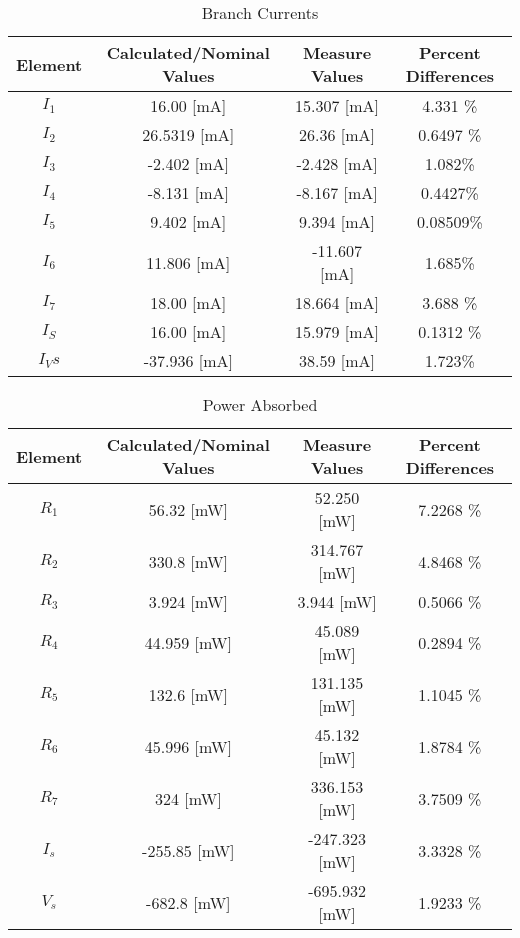 \documentclass{article}
\begin{document}
\begin{table}[h]
\begin{center}
\label{code:resis}
\caption{Branch Currents}
\begin{tabular}{c|c|c|c}
Element & Calculated/Nominal Values & Measure Values & Percent Differences 
\\\hline
$I_1$ & 16.00 [mA] & 15.307 [mA] & 4.331 \% \\
$I_2$ & 26.5319 [mA] & 26.36 [mA] & 0.6497 \% \\
$I_3$ & -2.402 [mA] & -2.428 [mA] & 1.082\% \\
$I_4$ & -8.131 [mA] & -8.167 [mA] & 0.4427\% \\
$I_5$ & 9.402 [mA] & 9.394 [mA] & 0.08509\% \\
$I_6$ & 11.806 [mA] & -11.607 [mA] & 1.685\% \\
$I_7$ & 18.00 [mA] & 18.664 [mA] & 3.688 \% \\
$I_S$ & 16.00 [mA] & 15.979 [mA] & 0.1312 \% \\
$I_Vs$ & -37.936  [mA] & 38.59 [mA] &  1.723\% 

\end{tabular}
\end{center}

\end{table}

\begin{table}[h]
\begin{center}
\label{code:power}
\caption{Power Absorbed}
\begin{tabular}{c|c|c|c}
Element & Calculated/Nominal Values & Measure Values & Percent Differences 
\\\hline
$R_1$	&	56.32	[mW] &	52.250	[mW] &	7.2268	\% \\
$R_2$	&	330.8	[mW] &	314.767	[mW] &	4.8468	\% \\
$R_3$	&	3.924	[mW] &	3.944	[mW] &	0.5066	\% \\
$R_4$	&	44.959	[mW] &	45.089	[mW] &	0.2894	\% \\
$R_5$	&	132.6	[mW] &	131.135	[mW] &	1.1045	\% \\
$R_6$	&	45.996	[mW] &	45.132	[mW] &	1.8784	\% \\
$R_7$	&	324	[mW] &	336.153	[mW] &	3.7509	\% \\
$I_s$	&	-255.85	[mW] &	-247.323	[mW] &	3.3328	\% \\
$V_s$	&	-682.8	[mW] &	-695.932	[mW] &	1.9233	\% 


\end{tabular}
\end{center}

\end{table}
\end{document}

